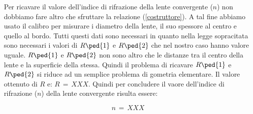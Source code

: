 Per ricavare il valore dell'indice di rifrazione della lente convergente ($n$) non dobbiamo fare altro che sfruttare la relazione (\ref{costruttore}). A tal fine abbiamo usato il calibro per misurare i diametro della lente, il suo spessore al centro e quello al bordo. Tutti questi dati sono necessari in quanto nella legge sopracitata sono necessari i valori di $R\ped{1}$ e $R\ped{2}$ che nel nostro caso hanno valore uguale. $R\ped{1}$ e $R\ped{2}$ non sono altro che le distanze tra il centro della lente e la superficie della stessa. Quindi il problema di ricavare $R\ped{1}$ e $R\ped{2}$ si riduce ad un semplice problema di gometria elementare.
Il valore ottenuto di $R$ e: $R \,=\, XXX$.
Quindi per concludere il vaore dell'indice di rifrazione ($n$) della lente convergente risulta essere:

\begin{equation}
	n \,=\, XXX
\end{equation}







